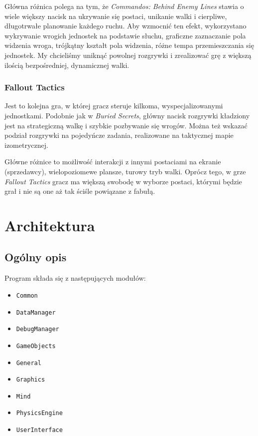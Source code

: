 \documentclass[licencjacka]{pracamgr}
\begin{document}
      Główna różnica polega na tym, że \emph{Commandos: Behind Enemy Lines} stawia o wiele większy nacisk na ukrywanie się postaci, unikanie walki
      i cierpliwe, długotrwałe planowanie każdego ruchu. Aby wzmocnić ten efekt, wykorzystano wykrywanie wrogich jednostek na podstawie słuchu,
      graficzne zaznaczanie pola widzenia wroga, trójkątny kształt pola widzenia, różne tempa przemieszczania się jednostek.
      My chcieliśmy uniknąć powolnej rozgrywki i zrealizować grę z większą ilością bezpośredniej, dynamicznej walki.

    \subsection{Fallout Tactics}
      Jest to kolejna gra, w której gracz steruje kilkoma, wyspecjalizowanymi jednostkami. Podobnie jak w \emph{Buried Secrets}, główny nacisk rozgrywki
      kładziony jest na strategiczną walkę i szybkie pozbywanie się wrogów. Można też wskazać podział rozgrywki na pojedyńcze zadania,
      realizowane na taktycznej mapie izometrycznej.

      Główne różnice to możliwość interakcji z innymi postaciami na ekranie (sprzedawcy), wielopoziomewe plansze, turowy tryb walki. Oprócz tego,
      w grze \emph{Fallout Tactics} gracz ma większą swobodę w wyborze postaci, którymi będzie grał i nie są one aż tak ściśle powiązane z fabułą.


\chapter{Architektura}
  \section{Ogólny opis}
    Program składa się z następujących modułów:
    \begin{itemize}
      \item \texttt{Common}
      \item \texttt{DataManager}
      \item \texttt{DebugManager}
      \item \texttt{GameObjects}
      \item \texttt{General}
      \item \texttt{Graphics}
      \item \texttt{Mind}
      \item \texttt{PhysicsEngine}
      \item \texttt{UserInterface}
    \end{itemize}
\end{document}
